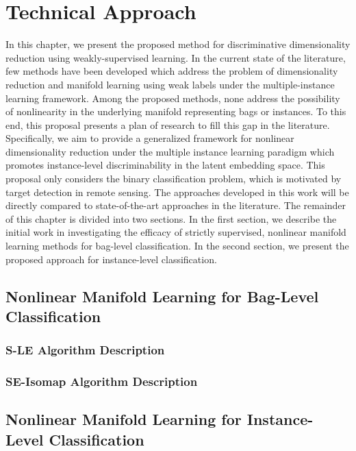 \chapter{Technical Approach}
In this chapter, we present the proposed method for discriminative dimensionality reduction using weakly-supervised learning. In the current state of the literature, few methods have been developed which address the problem of dimensionality reduction and manifold learning using weak labels under the multiple-instance learning framework.  Among the proposed methods, none address the possibility of nonlinearity in the underlying manifold representing bags or instances. To this end, this proposal presents a plan of research to fill this gap in the literature.  Specifically, we aim to provide a generalized framework for nonlinear dimensionality reduction under the multiple instance learning paradigm which promotes instance-level discriminability in the latent embedding space.  This proposal only considers the binary classification problem, which is motivated by target detection in remote  sensing. The approaches developed in this work will be directly compared to state-of-the-art approaches in the literature.  The remainder of this chapter is divided into two sections.  In the first section, we describe the initial work in investigating the efficacy of strictly supervised, nonlinear manifold learning methods for bag-level classification.  In the second section, we present the proposed approach for instance-level classification.

\section{Nonlinear Manifold Learning for Bag-Level Classification}

\subsection{S-LE Algorithm Description}

\subsection{SE-Isomap Algorithm Description}


\section{Nonlinear Manifold Learning for Instance-Level Classification}